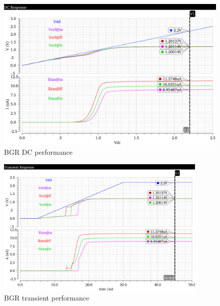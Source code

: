 \documentclass[12pt,a4paper,UKenglish]{article}
\begin{document}
\begin{figure}[htbp] %
   \centering
   \includegraphics[width=\textwidth]{img/bgr_dc.pdf} 
   \caption{BGR DC performance}
   \label{bgr_dc}
\end{figure}

\begin{figure}[htbp] %
   \centering
   \includegraphics[width=0.9\textwidth]{img/bgr_tran.pdf} 
   \caption{BGR transient performance}
   \label{bgr_tran}
\end{figure}
\end{document}
